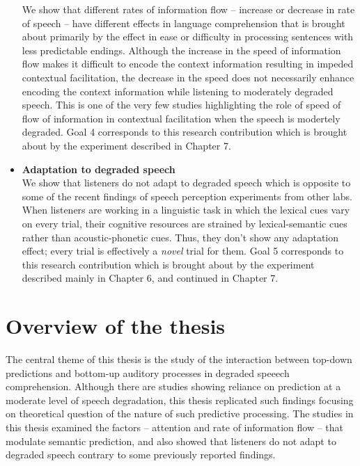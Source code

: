 \documentclass[a4paper, nobind]{templates/ociamthesis}
\begin{document}
\begin{itemize}
  We show that different rates of information flow -- increase or decrease in rate of speech -- have different effects in language comprehension that is brought about primarily by the effect in ease or difficulty in processing sentences with less predictable endings.
  Although the increase in the speed of information flow makes it difficult to encode the context information resulting in impeded contextual facilitation,
  the decrease in the speed does not necessarily enhance encoding the context information while listening to moderately degraded speech.
  This is one of the very few studies highlighting the role of speed of flow of information in contextual facilitation when the speech is modertely degraded.
  Goal 4 corresponds to this research contribution which is brought about by the experiment described in Chapter 7.
\item
  \textbf{Adaptation to degraded speech}\\
  We show that listeners do not adapt to degraded speech which is opposite to some of the recent findings of speech perception experiments from other labs.
  When listeners are working in a linguistic task in which the lexical cues vary on every trial, their cognitive resources are strained by lexical-semantic cues rather than acoustic-phonetic cues.
  Thus, they don't show any adaptation effect; every trial is effectively a \emph{novel} trial for them.
  Goal 5 corresponds to this research contribution which is brought about by the experiment described mainly in Chapter 6, and continued in Chapter 7.
\end{itemize}

\hypertarget{overview-of-the-thesis}{%
\section{Overview of the thesis}\label{overview-of-the-thesis}}

The central theme of this thesis is the study of the interaction between top-down predictions and bottom-up auditory processes in degraded speeech comprehension.
Although there are studies showing reliance on prediction at a moderate level of speech degradation,
this thesis replicated such findings focusing on theoretical question of the nature of such predictive processing.
The studies in this thesis examined the factors -- attention and rate of information flow -- that modulate semantic prediction,
and also showed that listeners do not adapt to degraded speech contrary to some previously reported findings.
\end{document}
